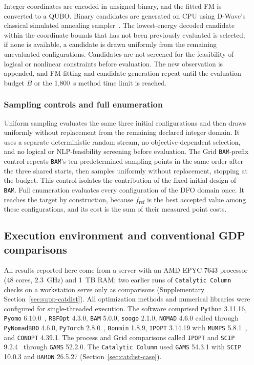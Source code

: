 \documentclass{article}
\begin{document}
Integer coordinates are encoded in unsigned binary, and the fitted FM is converted to a QUBO.
Binary candidates are generated on CPU using D-Wave's classical simulated annealing sampler~\citep{dwaveSamplers}.
The lowest-energy decoded candidate within the coordinate bounds that has not been previously evaluated is selected; if none is available, a candidate is drawn uniformly from the remaining unevaluated configurations.
Candidates are not screened for the feasibility of logical or nonlinear constraints before evaluation.
The new observation is appended, and FM fitting and candidate generation repeat until the evaluation budget \(B\) or the 1,800~s method time limit is reached.

\subsubsection{Sampling controls and full enumeration}
\label{sec:sampling-controls}
Uniform sampling evaluates the same three initial configurations and then draws uniformly without replacement from the remaining declared integer domain.
It uses a separate deterministic random stream, no objective-dependent selection, and no logical or NLP-feasibility screening before evaluation.
The Grid \texttt{BAM}-prefix control repeats \texttt{BAM}'s ten predetermined sampling points in the same order after the three shared starts, then samples uniformly without replacement, stopping at the budget.
This control isolates the contribution of the fixed initial design of \texttt{BAM}.
Full enumeration evaluates every configuration of the DFO domain once.
It reaches the target by construction, because \(f_{\mathrm{ref}}\) is the best accepted value among these configurations, and its cost is the sum of their measured point costs.

\subsection{Execution environment and conventional GDP comparisons}
\label{sec:protocol}
All results reported here come from a server with an AMD EPYC 7643 processor (48 cores, 2.3~GHz) and 1~TB RAM; two earlier runs of \texttt{Catalytic Column} checks on a workstation serve only as comparisons (Supplementary Section~\ref{sec:supp-catdist}).
All optimization methods and numerical libraries were configured for single-threaded execution.
The software comprised \texttt{Python} 3.11.16, \texttt{Pyomo} 6.10.0~\citep{bynum2021pyomo}, \texttt{RBFOpt} 4.3.0, \texttt{BAM} 5.0.0, \texttt{soogo} 2.1.0, \texttt{NOMAD} 4.6.0 called through \texttt{PyNomadBBO} 4.6.0, \texttt{PyTorch} 2.8.0~\citep{paszke2019pytorch}, \texttt{Bonmin} 1.8.9, \texttt{IPOPT} 3.14.19 with \texttt{MUMPS} 5.8.1~\citep{amestoy2001mumps}, and \texttt{CONOPT} 4.39.1.
The process and Grid comparisons called \texttt{IPOPT} and \texttt{SCIP} 9.2.4~\citep{bolusani2024scip} through \texttt{GAMS} 52.2.0.
The \texttt{Catalytic Column} used \texttt{GAMS} 54.3.1 with \texttt{SCIP} 10.0.3 and \texttt{BARON} 26.5.27 (Section~\ref{sec:catdist-case}).
\end{document}
